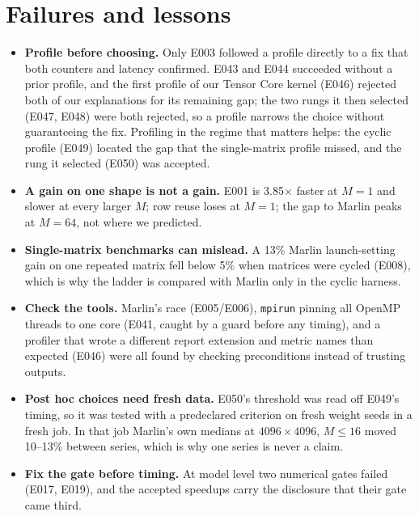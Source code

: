 \documentclass[sigconf,nonacm]{acmart}
\begin{document}
\section{Failures and lessons}
\begin{itemize}
\item \textbf{Profile before choosing.} Only E003 followed a profile directly to a fix that both counters and latency confirmed. E043 and E044 succeeded without a prior profile, and the first profile of our Tensor Core kernel (E046) rejected both of our explanations for its remaining gap; the two rungs it then selected (E047, E048) were both rejected, so a profile narrows the choice without guaranteeing the fix. Profiling in the regime that matters helps: the cyclic profile (E049) located the gap that the single-matrix profile missed, and the rung it selected (E050) was accepted.
\item \textbf{A gain on one shape is not a gain.} E001 is 3.85$\times$ faster at $M=1$ and slower at every larger $M$; row reuse loses at $M=1$; the gap to Marlin peaks at $M=64$, not where we predicted.
\item \textbf{Single-matrix benchmarks can mislead.} A 13\% Marlin launch-setting gain on one repeated matrix fell below 5\% when matrices were cycled (E008), which is why the ladder is compared with Marlin only in the cyclic harness.
\item \textbf{Check the tools.} Marlin's race (E005/E006), \texttt{mpirun} pinning all OpenMP threads to one core (E041, caught by a guard before any timing), and a profiler that wrote a different report extension and metric names than expected (E046) were all found by checking preconditions instead of trusting outputs.
\item \textbf{Post hoc choices need fresh data.} E050's threshold was read off E049's timing, so it was tested with a predeclared criterion on fresh weight seeds in a fresh job. In that job Marlin's own medians at $4096\times4096$, $M \le 16$ moved 10--13\% between series, which is why one series is never a claim.
\item \textbf{Fix the gate before timing.} At model level two numerical gates failed (E017, E019), and the accepted speedups carry the disclosure that their gate came third.
\end{itemize}
\end{document}
